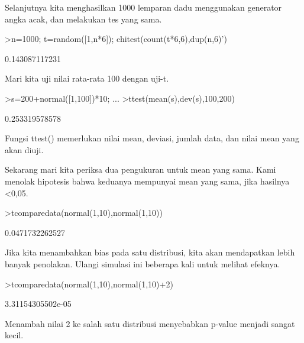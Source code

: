 \documentclass{article}
\begin{document}
\begin{eulernotebook}
\begin{eulercomment}
\begin{eulercomment}
\begin{eulercomment}
Selanjutnya kita menghasilkan 1000 lemparan dadu menggunakan generator
angka acak, dan melakukan tes yang sama.
\end{eulercomment}
\begin{eulerprompt}
>n=1000; t=random([1,n*6]); chitest(count(t*6,6),dup(n,6)')
\end{eulerprompt}
\begin{euleroutput}
  0.143087117231
\end{euleroutput}
\begin{eulercomment}
Mari kita uji nilai rata-rata 100 dengan uji-t.
\end{eulercomment}
\begin{eulerprompt}
>s=200+normal([1,100])*10; ...
>ttest(mean(s),dev(s),100,200)
\end{eulerprompt}
\begin{euleroutput}
  0.253319578578
\end{euleroutput}
\begin{eulercomment}
Fungsi ttest() memerlukan nilai mean, deviasi, jumlah data, dan nilai
mean yang akan diuji.

Sekarang mari kita periksa dua pengukuran untuk mean yang sama. Kami
menolak hipotesis bahwa keduanya mempunyai mean yang sama, jika
hasilnya \textless{}0,05.
\end{eulercomment}
\begin{eulerprompt}
>tcomparedata(normal(1,10),normal(1,10))
\end{eulerprompt}
\begin{euleroutput}
  0.0471732262527
\end{euleroutput}
\begin{eulercomment}
Jika kita menambahkan bias pada satu distribusi, kita akan mendapatkan
lebih banyak penolakan. Ulangi simulasi ini beberapa kali untuk
melihat efeknya.
\end{eulercomment}
\begin{eulerprompt}
>tcomparedata(normal(1,10),normal(1,10)+2)
\end{eulerprompt}
\begin{euleroutput}
  3.31154305502e-05
\end{euleroutput}
\begin{eulercomment}
Menambah nilai 2 ke salah satu distribusi menyebabkan p-value menjadi
sangat kecil.


\end{eulercomment}
\end{eulercomment}
\end{eulercomment}
\end{eulernotebook}
\end{document}
